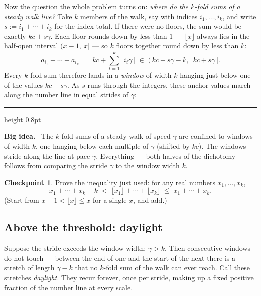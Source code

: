 \documentclass[11pt,reqno]{amsart}
\theoremstyle{plain}
\theoremstyle{definition}
\newtheorem{checkpoint}[theorem]{Checkpoint}   %
\theoremstyle{remark}
\newenvironment{bigidea}
  {\par\medskip\noindent\hspace*{0.02\linewidth}%
   \begin{minipage}{0.96\linewidth}
   {\color{blue!55!black}\hrule height 0.8pt}\vspace{6pt}
   \noindent\textbf{Big idea.}\ }
  {\par\vspace{6pt}{\color{blue!55!black}\hrule height 0.8pt}%
   \end{minipage}\par\medskip}
\begin{document}
Now the question the whole problem turns on: \emph{where do the $k$-fold sums of a
steady walk live?} Take $k$ members of the walk, say with indices $i_1, \dots, i_k$,
and write $s := i_1 + \cdots + i_k$ for the index total. If there were no floors, the
sum would be exactly $kc + s\gamma$. Each floor rounds down by less than $1$ ---
$\lfloor x \rfloor$ always lies in the half-open interval $(x - 1,\ x]$ --- so $k$
floors together round down by less than $k$:
\[
  a_{i_1} + \cdots + a_{i_k}
  \;=\; kc + \sum_{t=1}^{k} \lfloor i_t \gamma \rfloor
  \;\in\; \big(\, kc + s\gamma - k,\ \; kc + s\gamma \,\big].
\]
Every $k$-fold sum therefore lands in a \emph{window} of width $k$ hanging just below
one of the values $kc + s\gamma$. As $s$ runs through the integers, these anchor
values march along the number line in equal strides of $\gamma$:

\begin{bigidea}
The $k$-fold sums of a steady walk of speed $\gamma$ are confined to windows of width
$k$, one hanging below each multiple of $\gamma$ (shifted by $kc$). The windows stride
along the line at pace $\gamma$. Everything --- both halves of the dichotomy ---
follows from comparing the stride $\gamma$ to the window width $k$.
\end{bigidea}

\begin{checkpoint}\label{chk:floors}
Prove the inequality just used: for any real numbers $x_1, \dots, x_k$,
\[
  x_1 + \cdots + x_k - k \;<\; \lfloor x_1 \rfloor + \cdots + \lfloor x_k \rfloor
  \;\le\; x_1 + \cdots + x_k .
\]
(Start from $x - 1 < \lfloor x \rfloor \le x$ for a single $x$, and add.)
\end{checkpoint}

\subsection{Above the threshold: daylight}\label{sec:daylight}

Suppose the stride exceeds the window width: $\gamma > k$. Then consecutive windows do
not touch --- between the end of one and the start of the next there is a stretch of
length $\gamma - k$ that no $k$-fold sum of the walk can ever reach. Call these
stretches \emph{daylight}. They recur forever, once per stride, making up a fixed
positive fraction of the number line at every scale.
\end{document}
